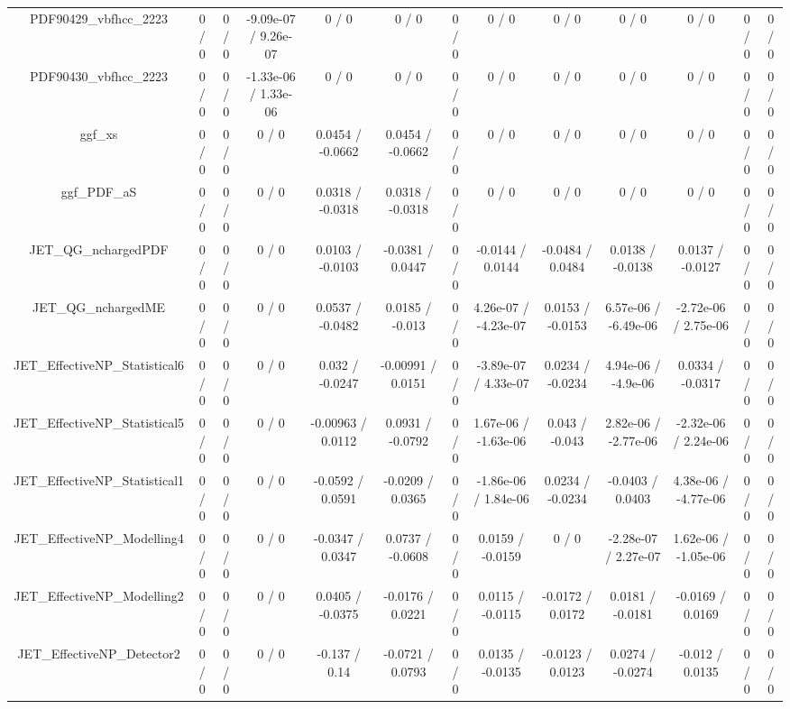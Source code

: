 \documentclass[10pt]{article}
\begin{document}
\begin{table}[htbp]
\begin{center}
\begin{tabular}{|c|c|c|c|c|c|c|c|c|c|c|c|c|}
  PDF90429_vbfhcc_2223 & 0 / 0 & 0 / 0 & -9.09e-07 / 9.26e-07 & 0 / 0 & 0 / 0 & 0 / 0 & 0 / 0 & 0 / 0 & 0 / 0 & 0 / 0 & 0 / 0 & 0 / 0 \\ 
  PDF90430_vbfhcc_2223 & 0 / 0 & 0 / 0 & -1.33e-06 / 1.33e-06 & 0 / 0 & 0 / 0 & 0 / 0 & 0 / 0 & 0 / 0 & 0 / 0 & 0 / 0 & 0 / 0 & 0 / 0 \\ 
  ggf_xs & 0 / 0 & 0 / 0 & 0 / 0 & 0.0454 / -0.0662 & 0.0454 / -0.0662 & 0 / 0 & 0 / 0 & 0 / 0 & 0 / 0 & 0 / 0 & 0 / 0 & 0 / 0 \\ 
  ggf_PDF_aS & 0 / 0 & 0 / 0 & 0 / 0 & 0.0318 / -0.0318 & 0.0318 / -0.0318 & 0 / 0 & 0 / 0 & 0 / 0 & 0 / 0 & 0 / 0 & 0 / 0 & 0 / 0 \\ 
  JET_QG_nchargedPDF & 0 / 0 & 0 / 0 & 0 / 0 & 0.0103 / -0.0103 & -0.0381 / 0.0447 & 0 / 0 & -0.0144 / 0.0144 & -0.0484 / 0.0484 & 0.0138 / -0.0138 & 0.0137 / -0.0127 & 0 / 0 & 0 / 0 \\ 
  JET_QG_nchargedME & 0 / 0 & 0 / 0 & 0 / 0 & 0.0537 / -0.0482 & 0.0185 / -0.013 & 0 / 0 & 4.26e-07 / -4.23e-07 & 0.0153 / -0.0153 & 6.57e-06 / -6.49e-06 & -2.72e-06 / 2.75e-06 & 0 / 0 & 0 / 0 \\ 
  JET_EffectiveNP_Statistical6 & 0 / 0 & 0 / 0 & 0 / 0 & 0.032 / -0.0247 & -0.00991 / 0.0151 & 0 / 0 & -3.89e-07 / 4.33e-07 & 0.0234 / -0.0234 & 4.94e-06 / -4.9e-06 & 0.0334 / -0.0317 & 0 / 0 & 0 / 0 \\ 
  JET_EffectiveNP_Statistical5 & 0 / 0 & 0 / 0 & 0 / 0 & -0.00963 / 0.0112 & 0.0931 / -0.0792 & 0 / 0 & 1.67e-06 / -1.63e-06 & 0.043 / -0.043 & 2.82e-06 / -2.77e-06 & -2.32e-06 / 2.24e-06 & 0 / 0 & 0 / 0 \\ 
  JET_EffectiveNP_Statistical1 & 0 / 0 & 0 / 0 & 0 / 0 & -0.0592 / 0.0591 & -0.0209 / 0.0365 & 0 / 0 & -1.86e-06 / 1.84e-06 & 0.0234 / -0.0234 & -0.0403 / 0.0403 & 4.38e-06 / -4.77e-06 & 0 / 0 & 0 / 0 \\ 
  JET_EffectiveNP_Modelling4 & 0 / 0 & 0 / 0 & 0 / 0 & -0.0347 / 0.0347 & 0.0737 / -0.0608 & 0 / 0 & 0.0159 / -0.0159 & 0 / 0 & -2.28e-07 / 2.27e-07 & 1.62e-06 / -1.05e-06 & 0 / 0 & 0 / 0 \\ 
  JET_EffectiveNP_Modelling2 & 0 / 0 & 0 / 0 & 0 / 0 & 0.0405 / -0.0375 & -0.0176 / 0.0221 & 0 / 0 & 0.0115 / -0.0115 & -0.0172 / 0.0172 & 0.0181 / -0.0181 & -0.0169 / 0.0169 & 0 / 0 & 0 / 0 \\ 
  JET_EffectiveNP_Detector2 & 0 / 0 & 0 / 0 & 0 / 0 & -0.137 / 0.14 & -0.0721 / 0.0793 & 0 / 0 & 0.0135 / -0.0135 & -0.0123 / 0.0123 & 0.0274 / -0.0274 & -0.012 / 0.0135 & 0 / 0 & 0 / 0 \\ 

\end{tabular}
\end{center}
\end{table}
\end{document}
